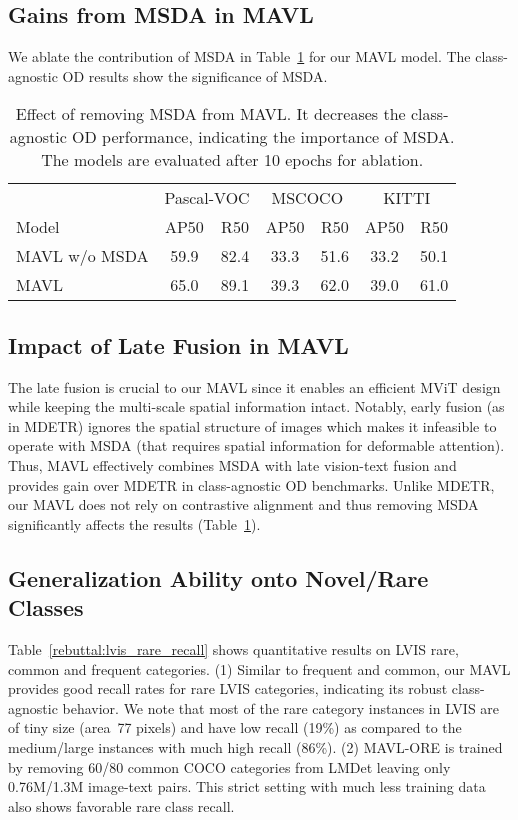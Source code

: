 \documentclass[runningheads]{llncs}
\begin{document}
\subsection{Gains from MSDA in MAVL}
We ablate the contribution of MSDA in Table~\ref{rebuttal:msda_contribution} for our MAVL model. The class-agnostic OD results show the significance of MSDA.

\begin{table}[!h]
\centering
\begin{tabular}{lcccccc}
\toprule
\rowcolor{Gray} & \multicolumn{2}{c}{Pascal-VOC} & \multicolumn{2}{c}{MSCOCO} & \multicolumn{2}{c}{KITTI} \\
\rowcolor{Gray} Model & AP50 & R50 & AP50 & R50 & AP50 & R50 \\
\midrule
\midrule

MAVL w/o MSDA & 59.9 & 82.4 & 33.3 & 51.6 & 33.2 & 50.1 \\
MAVL & 65.0 & 89.1 & 39.3 & 62.0 & 39.0 & 61.0 \\
\bottomrule
\end{tabular}
\caption{Effect of removing MSDA from MAVL. It decreases the class-agnostic OD performance, indicating the importance of MSDA. The models are evaluated after 10 epochs for ablation.}
\label{rebuttal:msda_contribution}
\end{table}


\subsection{Impact of Late Fusion in MAVL}
The late fusion is crucial to our MAVL since it enables an efficient MViT design while keeping the multi-scale spatial information intact. Notably, early fusion (as in MDETR) ignores the spatial structure of images which makes it infeasible to operate with MSDA (that requires spatial information for deformable attention). Thus, MAVL effectively combines MSDA with late vision-text fusion and provides gain over MDETR in class-agnostic OD benchmarks. Unlike MDETR, our MAVL does not rely on contrastive alignment and thus removing MSDA significantly affects the results (Table~\ref{rebuttal:msda_contribution}).

\subsection{Generalization Ability onto Novel/Rare Classes}
Table~\ref{rebuttal:lvis_rare_recall} shows quantitative results on LVIS rare, common and frequent categories. (1) Similar to frequent and common, our MAVL provides good recall rates for rare LVIS categories, indicating its robust class-agnostic behavior. We note that most of the rare category instances in LVIS are of tiny size (area~77 pixels) and have low recall (19\%) as compared to the medium/large instances with much high recall (86\%). (2) MAVL-ORE is trained by removing 60/80 common COCO categories from LMDet leaving only 0.76M/1.3M image-text pairs. This strict setting with much less training data also shows favorable rare class recall.
\end{document}
